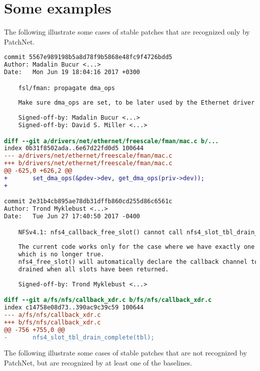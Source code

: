 \appendix
\section{Some examples}

The following illustrate some cases of stable patches that are recognized
only by PatchNet.

\begin{lstlisting}[language=diff]
commit 5567e989198b5a8d78f9b5868e48fc9f4726bdd5
Author: Madalin Bucur <...>
Date:   Mon Jun 19 18:04:16 2017 +0300

    fsl/fman: propagate dma_ops
    
    Make sure dma_ops are set, to be later used by the Ethernet driver.
    
    Signed-off-by: Madalin Bucur <...>
    Signed-off-by: David S. Miller <...>

diff --git a/drivers/net/ethernet/freescale/fman/mac.c b/...
index 0b31f8502ada..6e67d22fd0d5 100644
--- a/drivers/net/ethernet/freescale/fman/mac.c
+++ b/drivers/net/ethernet/freescale/fman/mac.c
@@ -625,0 +626,2 @@
+       set_dma_ops(&pdev->dev, get_dma_ops(priv->dev));
+

commit 2e31b4cb895ae78db31dffb860cd255d86c6561c
Author: Trond Myklebust <...>
Date:   Tue Jun 27 17:40:50 2017 -0400

    NFSv4.1: nfs4_callback_free_slot() cannot call nfs4_slot_tbl_drain_complete()
    
    The current code works only for the case where we have exactly one slot,
    which is no longer true.
    nfs4_free_slot() will automatically declare the callback channel to be
    drained when all slots have been returned.
    
    Signed-off-by: Trond Myklebust <...>

diff --git a/fs/nfs/callback_xdr.c b/fs/nfs/callback_xdr.c
index c14758e08d73..390ac9c39c59 100644
--- a/fs/nfs/callback_xdr.c
+++ b/fs/nfs/callback_xdr.c
@@ -756 +755,0 @@
-       nfs4_slot_tbl_drain_complete(tbl);
\end{lstlisting}

The following illustrate some cases of stable patches that are not recognized
by PatchNet, but are recognized by at least one of the baselines.

